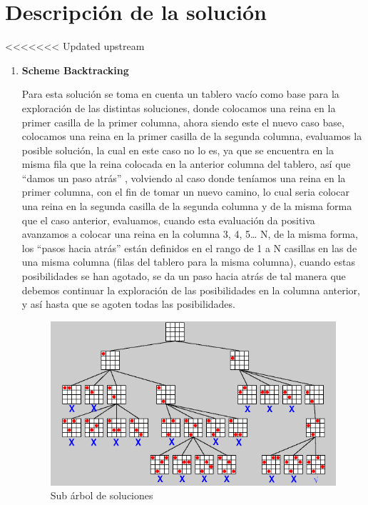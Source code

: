 \documentclass[12pt,a4paper]{article}
\begin{document}
\section{Descripción de la solución}
<<<<<<< Updated upstream
\begin{enumerate}
\item  \textbf{Scheme Backtracking}

Para esta solución se toma en cuenta un tablero vacío como base para la exploración de las distintas soluciones, donde colocamos una reina en la primer casilla de la primer columna, ahora siendo este el nuevo caso base, colocamos una reina en la primer casilla de la segunda columna, evaluamos la posible solución, la cual en este caso no lo es, ya que se encuentra en la misma fila que la reina colocada en la anterior columna del tablero, así que  “damos un paso atrás” , volviendo al caso donde teníamos una reina en la primer columna, con el fin de tomar un nuevo camino, lo cual seria colocar una reina en la segunda casilla de la segunda columna y de la misma forma que el caso anterior, evaluamos, cuando esta evaluación da positiva avanzamos a colocar una reina en la columna 3, 4, 5… N, de la misma forma, los “pasos hacia atrás”  están definidos en el rango de 1 a N casillas en las de una misma columna (filas del tablero para la misma columna), cuando estas posibilidades se han agotado, se da un paso hacia atrás de tal manera que debemos continuar la exploración de las posibilidades en la columna anterior, y así hasta que se agoten todas las posibilidades.

\begin{figure}[htp]
\centering
\graphicspath{ {imagenes/} }
\includegraphics[scale=0.50]{general.png}
\caption{Sub árbol de soluciones}
\label{foto}
\end{figure}


\end{enumerate}
\end{document}
